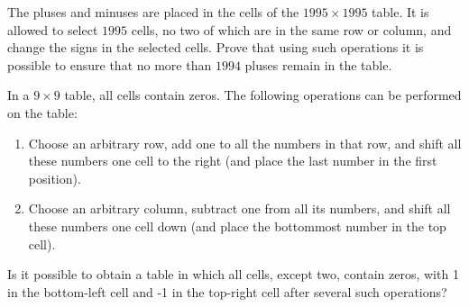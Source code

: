 \begin{problem} 
    The pluses and minuses are placed in the cells of the  $1995 \times 1995$ table. It is allowed to select $1995$ cells, no two of which are in the same row or column, and change the signs in the selected cells. Prove that using such operations it is possible to ensure that no more than $1994$ pluses remain in the table.
\end{problem}

\begin{problem} 
In a $9\times 9$ table, all cells contain zeros. The following operations can be performed on the table:
\begin{enumerate}
    \item Choose an arbitrary row, add one to all the numbers in that row, and shift all these numbers one cell to the right (and place the last number in the first position).
    \item Choose an arbitrary column, subtract one from all its numbers, and shift all these numbers one cell down (and place the bottommost number in the top cell).
\end{enumerate}
Is it possible to obtain a table in which all cells, except two, contain zeros, with 1 in the bottom-left cell and -1 in the top-right cell after several such operations?
\end{problem}